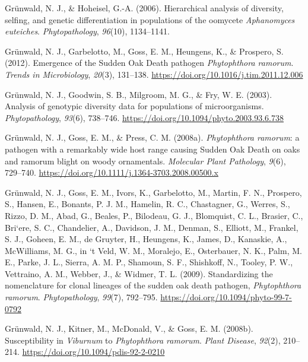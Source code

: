\documentclass[double,11pt]{beavtex}
\begin{document}
  \hypertarget{ref-grunwald2006hierarchical}{}
  Grünwald, N. J., \& Hoheisel, G.-A. (2006). Hierarchical analysis of
  diversity, selfing, and genetic differentiation in populations of the
  oomycete \emph{Aphanomyces euteiches}. \emph{Phytopathology},
  \emph{96}(10), 1134--1141.
  
  \hypertarget{ref-grunwald2012emergence}{}
  Grünwald, N. J., Garbelotto, M., Goss, E. M., Heungens, K., \& Prospero,
  S. (2012). Emergence of the Sudden Oak Death pathogen \emph{Phytophthora
  ramorum}. \emph{Trends in Microbiology}, \emph{20}(3), 131--138.
  \url{https://doi.org/10.1016/j.tim.2011.12.006}
  
  \hypertarget{ref-grunwald2003analysis}{}
  Grünwald, N. J., Goodwin, S. B., Milgroom, M. G., \& Fry, W. E. (2003).
  Analysis of genotypic diversity data for populations of microorganisms.
  \emph{Phytopathology}, \emph{93}(6), 738--746.
  \url{https://doi.org/10.1094/phyto.2003.93.6.738}
  
  \hypertarget{ref-grunwald2008phytophthora}{}
  Grünwald, N. J., Goss, E. M., \& Press, C. M. (2008a).
  \emph{Phytophthora ramorum}: a pathogen with a remarkably wide host
  range causing Sudden Oak Death on oaks and ramorum blight on woody
  ornamentals. \emph{Molecular Plant Pathology}, \emph{9}(6), 729--740.
  \url{https://doi.org/10.1111/j.1364-3703.2008.00500.x}
  
  \hypertarget{ref-grunwald2009standardizing}{}
  Grünwald, N. J., Goss, E. M., Ivors, K., Garbelotto, M., Martin, F. N.,
  Prospero, S., Hansen, E., Bonants, P. J. M., Hamelin, R. C., Chastagner,
  G., Werres, S., Rizzo, D. M., Abad, G., Beales, P., Bilodeau, G. J.,
  Blomquist, C. L., Brasier, C., Bri\a`ere, S. C., Chandelier, A.,
  Davidson, J. M., Denman, S., Elliott, M., Frankel, S. J., Goheen, E. M.,
  de Gruyter, H., Heungens, K., James, D., Kanaskie, A., McWilliams, M.
  G., in `t Veld, W. M., Moralejo, E., Osterbauer, N. K., Palm, M. E.,
  Parke, J. L., Sierra, A. M. P., Shamoun, S. F., Shishkoff, N., Tooley,
  P. W., Vettraino, A. M., Webber, J., \& Widmer, T. L. (2009).
  Standardizing the nomenclature for clonal lineages of the sudden oak
  death pathogen, \emph{Phytophthora ramorum}. \emph{Phytopathology},
  \emph{99}(7), 792--795. \url{https://doi.org/10.1094/phyto-99-7-0792}
  
  \hypertarget{ref-grunwald2008susceptibility}{}
  Grünwald, N. J., Kitner, M., McDonald, V., \& Goss, E. M. (2008b).
  Susceptibility in \emph{Viburnum} to \emph{Phytophthora ramorum}.
  \emph{Plant Disease}, \emph{92}(2), 210--214.
  \url{https://doi.org/10.1094/pdis-92-2-0210}
  
\end{document}
